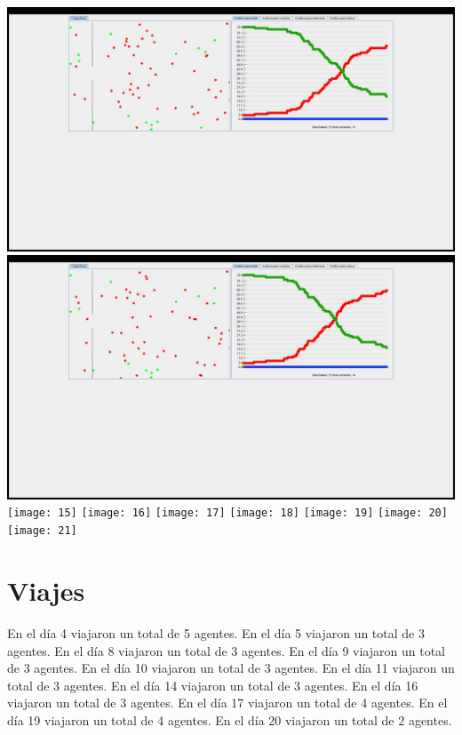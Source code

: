 \documentclass{report}
\begin{document}
\includegraphics[scale=0.20]{13}
\includegraphics[scale=0.20]{14}
\texttt{[image: 15]}
\texttt{[image: 16]}
\texttt{[image: 17]}
\texttt{[image: 18]}
\texttt{[image: 19]}
\texttt{[image: 20]}
\texttt{[image: 21]}
\newpage
\section{Viajes}
En el d\'ia 4 viajaron un total de 5 agentes.\n
En el d\'ia 5 viajaron un total de 3 agentes.\n
En el d\'ia 8 viajaron un total de 3 agentes.\n
En el d\'ia 9 viajaron un total de 3 agentes.\n
En el d\'ia 10 viajaron un total de 3 agentes.\n
En el d\'ia 11 viajaron un total de 3 agentes.\n
En el d\'ia 14 viajaron un total de 3 agentes.\n
En el d\'ia 16 viajaron un total de 3 agentes.\n
En el d\'ia 17 viajaron un total de 4 agentes.\n
En el d\'ia 19 viajaron un total de 4 agentes.\n
En el d\'ia 20 viajaron un total de 2 agentes.\newline
\end{document}
